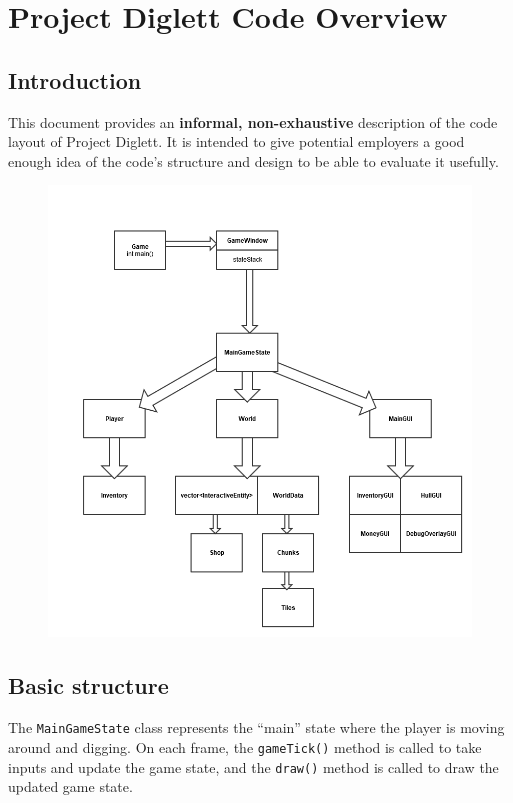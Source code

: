 \documentclass[10pt,twoside,a4paper]{article}
\begin{document}
\section*{Project Diglett Code Overview}

\subsection*{Introduction}

This document provides an \textbf{informal, non-exhaustive} description of the code layout of Project Diglett. It is intended to give potential employers a good enough idea of the code's structure and design to be able to evaluate it usefully.

\begin{figure}[H]
\centering \includegraphics[scale=0.5]{diagram.png}
\end{figure}

\subsection*{Basic structure}

The \verb|MainGameState| class represents the ``main'' state where the player is moving around and digging. 
On each frame, the \verb|gameTick()| method is called to take inputs and update the game state, and the \verb|draw()| method is called to draw the updated game state.
\end{document}
